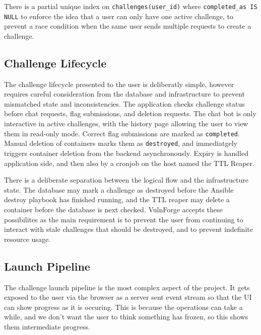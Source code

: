 There is a partial unique index on \verb|challenges(user_id)| where \verb|completed_as IS NULL| to enforce the idea that a user can only have one active challenge, to prevent a race condition when the same user sends multiple requests to create a challenge.

\subsection{Challenge Lifecycle}\label{sec:lifecycle}

The challenge lifecycle presented to the user is deliberatly simple, however requires careful consideration from the database and infrastructure to prevent mismatched state and inconsistencies. The application checks challenge status before chat requests, flag submissions, and deletion requests. The chat bot is only interactive in active challenges, with the history page allowing the user to view them in read-only mode. Correct flag submissions are marked as \verb|completed|. Manual deletion of containers marks them as \verb|destroyed|, and immediatgely triggers container deletion from the backend asynchronously. Expiry is handled application side, and then also by a cronjob on the host named the TTL Reaper. 

There is a deliberate separation between the logical flow and the infrastructure state. The database may mark a challenge as destroyed before the Ansible destroy playbook has finished running, and the TTL reaper may delete a container before the database is next checked. VulnForge accepts these possibilites as the main requirement is to prevent the user from continuing to interact with stale challenges that should be destroyed, and to prevent indefinite resource usage. 

\subsection{Launch Pipeline}\label{sec:launch_pipeline}
The challenge launch pipeline is the most complex aspect of the project. It gets exposed to the user via the browser as a server sent event stream so that the UI can show progress as it is occuring. This is because the operations can take a while, and we don't want the user to think something has frozen, so this shows them intermediate progress. 

